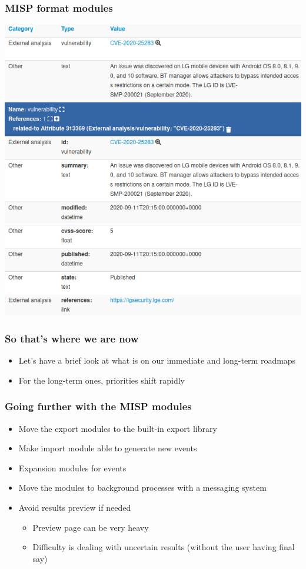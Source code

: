 \begin{frame}
\frametitle{MISP format modules}
\begin{center}
    \includegraphics[width=0.7\linewidth]{cve_module.png}
\end{center}
\end{frame}

\begin{frame}
\frametitle{So that's where we are now}
\begin{itemize}
	\item Let's have a brief look at what is on our immediate and long-term roadmaps
        \item For the long-term ones, priorities shift rapidly
\end{itemize}
\end{frame}

\begin{frame}
\frametitle{Going further with the MISP modules}
\begin{itemize}
    \item Move the export modules to the built-in export library
    \item Make import module able to generate new events
    \item Expansion modules for events
\end{itemize}
\begin{itemize}
    \item Move the modules to background processes with a
messaging system
    \item Avoid results preview if needed
    \begin{itemize}
        \item Preview page can be very heavy
        \item Difficulty is dealing with uncertain results (without the user
having final say)
    \end{itemize}
\end{itemize}
\end{frame}

